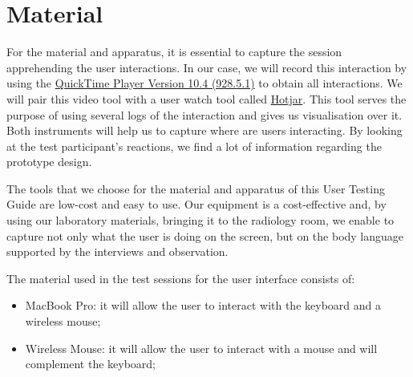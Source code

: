 
\section{Material}

For the material and apparatus, it is essential to capture the session apprehending the user interactions. In our case, we will record this interaction by using the \hyperlink{https://support.apple.com/quicktime}{QuickTime Player Version 10.4 (928.5.1)} to obtain all interactions. We will pair this video tool with a user watch tool called \hyperlink{https://www.hotjar.com/}{Hotjar}. This tool serves the purpose of using several logs of the interaction and gives us visualisation over it. Both instruments will help us to capture where are users interacting. By looking at the test participant's reactions, we find a lot of information regarding the prototype design.

\clearpage

The tools that we choose for the material and apparatus of this User Testing Guide are low-cost and easy to use. Our equipment is a cost-effective and, by using our laboratory materials, bringing it to the radiology room, we enable to capture not only what the user is doing on the screen, but on the body language supported by the interviews and observation.

\hfill

The material used in the test sessions for the user interface consists of:

\hfill

\begin{itemize}
  \item MacBook Pro: it will allow the user to interact with the keyboard and a wireless mouse;
  \item Wireless Mouse: it will allow the user to interact with a mouse and will complement the keyboard;
\end{itemize}

\hfill


